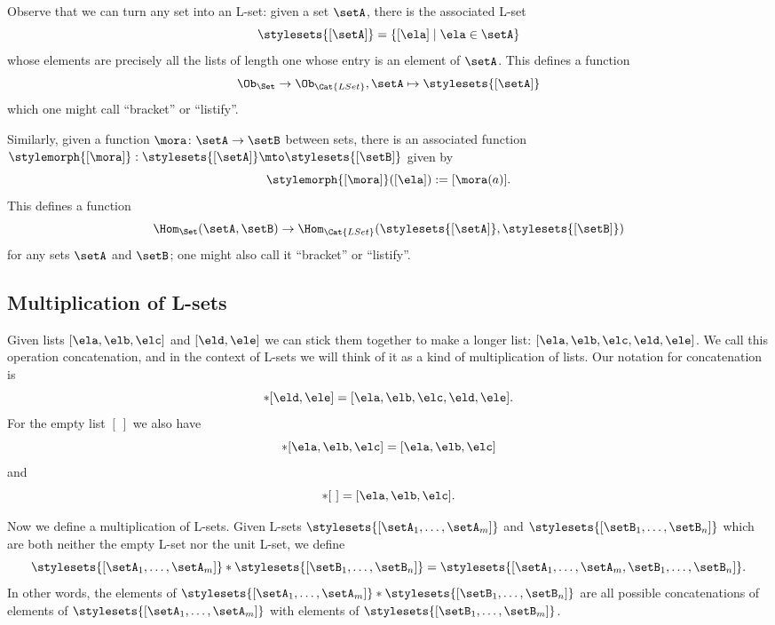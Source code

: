 Observe that we can turn any set into an L-set: given a set $\setA$, there is the associated L-set 
\begin{equation}
\stylesets{[\setA]} = \{ [\ela] \mid \ela \in \setA \}
\end{equation}
whose elements are precisely all the lists of length one whose entry is an element of $\setA$. This defines a function
\begin{equation}
\Ob_{\Set} \to \Ob_{\Cat{LSet}}, \setA \mapsto \stylesets{[\setA]}
\end{equation}
which one might call ``bracket'' or ``listify''. 

Similarly, given a function $\mora \colon \setA \to \setB$ between sets, there is an associated function $\stylemorph{[ \mora ]}: \stylesets{[\setA]} \mto \stylesets{[\setB]}$ given by 
\begin{equation}
\stylemorph{[ \mora ]} ([ \ela ]) := [\mora(a)].
\end{equation}
This defines a function 
\begin{equation}
\Hom_{\Set}(\setA,\setB) \to \Hom_{\Cat{LSet}}(\stylesets{[\setA]},\stylesets{[\setB]})
\end{equation}
for any sets $\setA$ and $\setB$; one might also call it ``bracket'' or ``listify''.





\subsection{Multiplication of L-sets}

Given lists $[\ela, \elb, \elc]$ and $[\eld, \ele]$ we can stick them together to make a longer list: $[\ela, \elb, \elc, \eld, \ele]$.
We call this operation concatenation, and in the context of L-sets we will think of it as a kind of multiplication of lists.
Our notation for concatenation is
\begin{equation}
    [\ela, \elb, \elc] * [\eld, \ele] = [\ela, \elb, \elc, \eld, \ele].
\end{equation}
For the empty list $[ \ ]$ we also have
\begin{equation}
    [ \ ] * [\ela, \elb, \elc]  = [\ela, \elb, \elc]
\end{equation}
and
\begin{equation}
    [\ela, \elb, \elc]  * [ \ ] = [\ela, \elb, \elc].
\end{equation}

Now we define a multiplication of L-sets.
Given L-sets $\stylesets{[\setA_1, \dots, \setA_m]}$ and $\stylesets{[\setB_1,  \dots, \setB_n]}$ which are both neither the empty L-set nor the unit L-set, we define
\begin{equation}
    \stylesets{[\setA_1, \dots, \setA_m]} * \stylesets{[\setB_1, \dots, \setB_n]} = \stylesets{[\setA_1, \dots, \setA_m, \setB_1,  \dots, \setB_n]}.
\end{equation}
In other words, the elements of $\stylesets{[\setA_1, \dots, \setA_m]} * \stylesets{[\setB_1, \dots, \setB_n]}$ are all possible concatenations of elements of $\stylesets{[\setA_1, \dots, \setA_m]}$ with elements of $\stylesets{[\setB_1, \dots, \setB_m]}$.

